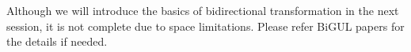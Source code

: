 Although we will introduce the basics of bidirectional transformation in the next session, it is not complete due to space limitations. Please refer BiGUL papers \cite{Ko:2016:BFV:2847538.2847544, Ko:2017:ABB:3177123.3158129} for the details if needed.




